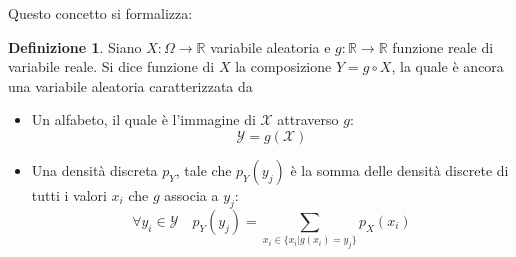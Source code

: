 \documentclass{article}
\theoremstyle{plain}
\theoremstyle{definition}
\newtheorem{definizione}{Definizione}[section]
\theoremstyle{remark}
\begin{document}
Questo concetto si formalizza:
\begin{definizione}
	Siano $X:\Omega\to\mathds{R}$ variabile aleatoria e $g:\mathds{R}\to\mathds{R}$ funzione reale di variabile reale. Si dice funzione di $X$ la composizione $Y=g\circ X$, la quale è ancora una variabile aleatoria caratterizzata da
	\begin{itemize}
		\item Un alfabeto, il quale è l'immagine di $\mathcal{X}$ attraverso $g$:
		\begin{equation*}
			\mathcal{Y}=g(\mathcal{X})
		\end{equation*}
		\item Una densità discreta $p_Y$, tale che $p_Y(y_j)$ è la somma delle densità discrete di tutti i valori $x_i$ che $g$ associa a $y_j$:
		\begin{equation*}
			\forall y_i\in\mathcal{Y}\quad p_Y(y_j)=\sum_{x_i\in\{x_i|g(x_i)=y_j\}}p_X(x_i)
		\end{equation*}
	\end{itemize}
\end{definizione}
\end{document}
